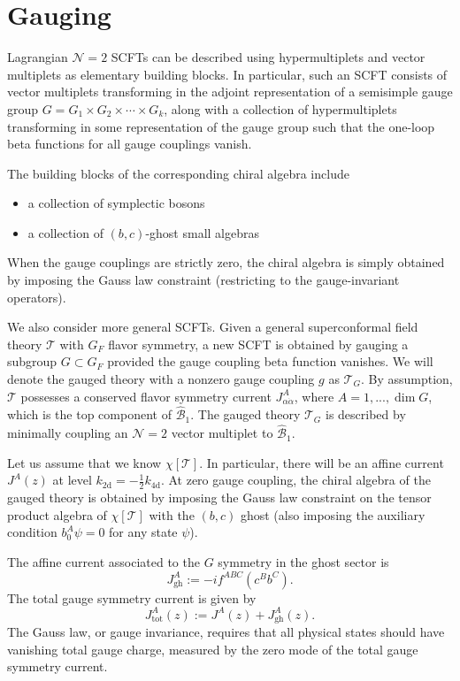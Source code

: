 \documentclass[a4paper,11pt]{article}
\begin{document}
\section{Gauging}

Lagrangian $\mathcal{N}=2$ SCFTs can be described using hypermultiplets and vector multiplets as elementary building blocks. In particular, such an SCFT consists of vector multiplets transforming in the adjoint representation of a semisimple gauge group $G = G_1 \times G_2 \times \cdots \times G_k$, along with a collection of hypermultiplets transforming in some representation of the gauge group such that the one-loop beta functions for all gauge couplings vanish.

The building blocks of the corresponding chiral algebra include
\begin{itemize}
    \item a collection of symplectic bosons
    \item a collection of $(b,c)$-ghost small algebras
\end{itemize}
When the gauge couplings are strictly zero, the chiral algebra is simply obtained by imposing the Gauss law constraint (restricting to the gauge-invariant operators).

We also consider more general SCFTs. Given a general superconformal field theory $\mathcal{T}$ with $G_F$ flavor symmetry, a new SCFT is obtained by gauging a subgroup $G \subset G_F$ provided the gauge coupling beta function vanishes. We will denote the gauged theory with a nonzero gauge coupling $g$ as $\mathcal{T}_G$. By assumption, $\mathcal{T}$ possesses a conserved flavor symmetry current $J^A_{\alpha \dot{\alpha}}$, where $A = 1,..., \dim G$, which is the top component of $\hat{\mathcal{B}}_1$. The gauged theory $\mathcal{T}_G$ is described by minimally coupling an $\mathcal{N}=2$ vector multiplet to $\hat{\mathcal{B}}_1$.

Let us assume that we know $\chi[\mathcal{T}]$. In particular, there will be an affine current $J^A(z)$ at level $k_\mathrm{2d} = - \frac{1}{2}k_\mathrm{4d}$. At zero gauge coupling, the chiral algebra of the gauged theory is obtained by imposing the Gauss law constraint on the tensor product algebra of $\chi[\mathcal{T}]$ with the $(b,c)$ ghost (also imposing the auxiliary condition $b_0^A \psi = 0$ for any state $\psi$).

The affine current associated to the $G$ symmetry in the ghost sector is
\begin{equation}
    J^A_\mathrm{gh} := -i f^{ABC} (c^B b^C).
\end{equation}
The total gauge symmetry current is given by
\begin{equation}
    J^A_\mathrm{tot}(z) := J^A(z) + J^A_\mathrm{gh}(z).
\end{equation}
The Gauss law, or gauge invariance, requires that all physical states should have vanishing total gauge charge, measured by the zero mode of the total gauge symmetry current.
\end{document}
